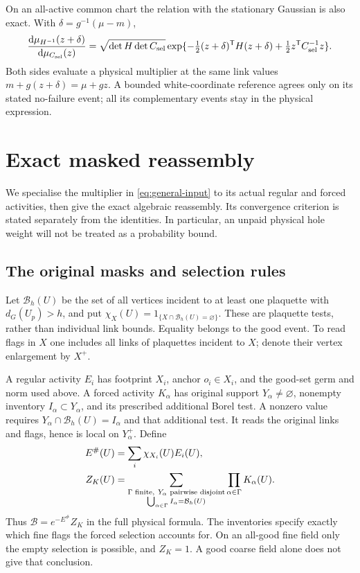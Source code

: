 \documentclass[11pt,reqno]{amsart}
\numberwithin{equation}{section}
\theoremstyle{definition}
\theoremstyle{remark}
\newcommand{\dd}{\mathrm d}
\begin{document}
On an all-active common chart the relation with the stationary
Gaussian is also exact. With \(\delta=g^{-1}(\mu-m)\),
\[
 \frac{\dd\mu_{H^{-1}}(z+\delta)}
      {\dd\mu_{C_{\rm sel}}(z)}
  =\sqrt{\det H\det C_{\rm sel}}
    \exp\{-\tfrac12(z+\delta)^{\mathsf T}H(z+\delta)
                         +\tfrac12z^{\mathsf T}C_{\rm sel}^{-1}z\}.
\]
Both sides evaluate a physical multiplier at the same link values
\(m+g(z+\delta)=\mu+gz\). A bounded white-coordinate
reference agrees only on its stated no-failure event; all its
complementary events stay in the physical expression.


\section{Exact masked reassembly}
\label{sec:exact-masked-reassembly}

We specialise the multiplier in \eqref{eq:general-input} to its
actual regular and forced activities, then give the exact
algebraic reassembly. Its convergence criterion is stated
separately from the identities. In particular, an unpaid physical
hole weight will not be treated as a probability bound.

\subsection{The original masks and selection rules}

Let \(\mathcal B_h(U)\) be the set of all vertices incident
to at least one plaquette with \(d_G(U_p)>h\), and put
\(\chi_X(U)=1_{\{X\cap\mathcal B_h(U)=\varnothing\}}\).
These are plaquette tests, rather than individual link bounds.
Equality belongs to the good event. To read flags in \(X\)
one includes all links of plaquettes incident to \(X\); denote
their vertex enlargement by \(X^+\).

A regular activity \(E_i\) has footprint \(X_i\), anchor
\(o_i\in X_i\), and the good-set germ and norm used above.
A forced activity \(K_\alpha\) has original support
\(Y_\alpha\ne\varnothing\), nonempty inventory
\(I_\alpha\subset Y_\alpha\), and its prescribed additional
Borel test. A nonzero value requires
\(Y_\alpha\cap\mathcal B_h(U)=I_\alpha\) and that additional
test. It reads the original links and flags, hence is local on
\(Y_\alpha^+\). Define
\begin{align}
 E^\#(U)&=\sum_i\chi_{X_i}(U)E_i(U),\notag\\
 Z_K(U)&=\sum_{\substack{\Gamma\text{ finite},\ Y_\alpha
                         \text{ pairwise disjoint}\\
                  \bigcup_{\alpha\in\Gamma}I_\alpha=\mathcal B_h(U)}}
                                      \prod_{\alpha\in\Gamma}K_\alpha(U).
 \label{eq:reassembly-input-gas}
\end{align}
Thus \(\mathcal B=e^{-E^\#}Z_K\) in the full physical formula.
The inventories specify exactly which fine flags the forced
selection accounts for. On an all-good fine field only the empty
selection is possible, and \(Z_K=1\). A good coarse field alone
does not give that conclusion.
\end{document}
